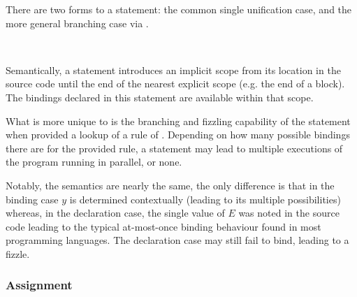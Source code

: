 There are two forms to a  statement: the common single unification case,
and the more general branching case via \Law{}.

\begin{bnf*}
     \\
\end{bnf*}

Semantically, a  statement introduces an implicit scope from its location
in the source code until the end of the nearest explicit scope (e.g. the end of a block).
The bindings declared in this statement are available within that scope.

\begin{prooftree}
\end{prooftree}

What is more unique to \Trilogy{} is the branching and fizzling capability of the
 statement when provided a lookup of a rule of \Law{}. Depending on
how many possible bindings there are for the provided rule, a  statement
may lead to multiple executions of the program running in parallel, or none.

\begin{prooftree}
\end{prooftree}

Notably, the semantics are nearly the same, the only difference is that in the
binding case $y$ is determined contextually (leading to its multiple possibilities)
whereas, in the declaration case, the single value of $E$ was noted in the source
code leading to the typical at-most-once binding behaviour found in most programming
languages. The declaration case may still fail to bind, leading to a fizzle.

\subsubsection{Assignment}

